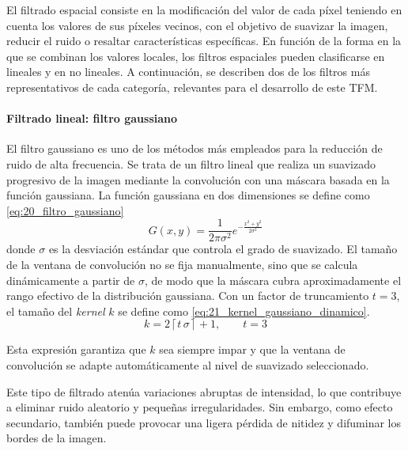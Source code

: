El filtrado espacial \cite{spacial_filtering} consiste en la modificación del valor de cada píxel teniendo en cuenta los 
valores de sus píxeles vecinos, con el objetivo de suavizar la imagen, reducir el ruido o resaltar
características específicas. En función de la forma en la que se combinan los valores locales, los 
filtros espaciales pueden clasificarse en lineales y en no lineales. A continuación, se describen 
dos de los filtros más representativos de cada categoría, relevantes para el desarrollo de 
este TFM.

\paragraph{Filtrado lineal: filtro gaussiano} \label{subsubsec:3_5_4_1_filtrado_lineal_filtro_gaussiano}
El filtro gaussiano \cite{gaussian_filter} es uno de los métodos más empleados para la reducción de 
ruido de alta frecuencia. Se trata de un filtro lineal que realiza un suavizado progresivo de la 
imagen mediante la convolución con una máscara basada en la función gaussiana.
La función gaussiana en dos dimensiones se define como \eqref{eq:20_filtro_gaussiano}
\begin{equation}
    G(x,y) = \frac{1}{2 \pi \sigma^2} e^{-\frac{x^2 + y^2}{2 \sigma^2}}
    \label{eq:20_filtro_gaussiano}
\end{equation}
donde \(\sigma\) es la desviación estándar que controla el grado de suavizado.
El tamaño de la ventana de convolución no se fija manualmente, sino que se calcula
dinámicamente a partir de \(\sigma\), de modo que la máscara cubra aproximadamente el
rango efectivo de la distribución gaussiana. Con un factor de truncamiento \(t=3\),
el tamaño del \textit{kernel} \(k\) se define como \eqref{eq:21_kernel_gaussiano_dinamico}.
\begin{equation}
    k = 2\left\lceil t\,\sigma \right\rceil + 1, \qquad t=3
    \label{eq:21_kernel_gaussiano_dinamico}
\end{equation}

Esta expresión garantiza que \(k\) sea siempre impar y que la ventana de convolución
se adapte automáticamente al nivel de suavizado seleccionado.

Este tipo de filtrado atenúa variaciones abruptas de intensidad, lo que contribuye a eliminar
ruido aleatorio y pequeñas irregularidades. Sin embargo, como efecto secundario, también puede provocar 
una ligera pérdida de nitidez y difuminar los bordes de la imagen. 

\newpage

